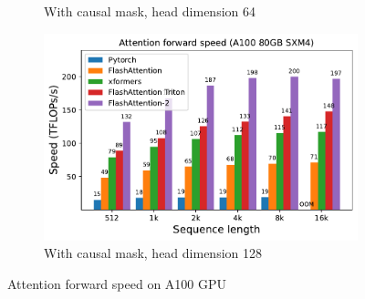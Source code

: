\begin{figure}[ht]
\begin{subfigure}{.5\textwidth}
    \caption{With causal mask, head dimension 64}
  \end{subfigure}%
  \begin{subfigure}{.5\textwidth}
    \centering
    \includegraphics[width=.95\linewidth]{figs/flash2_causal_True_hdim_128_fwd_speed.pdf}
    \caption{With causal mask, head dimension 128}
  \end{subfigure}
  \caption{Attention forward speed on A100 GPU}
  \label{fig:benchmark_attn_fwd}
\end{figure}

